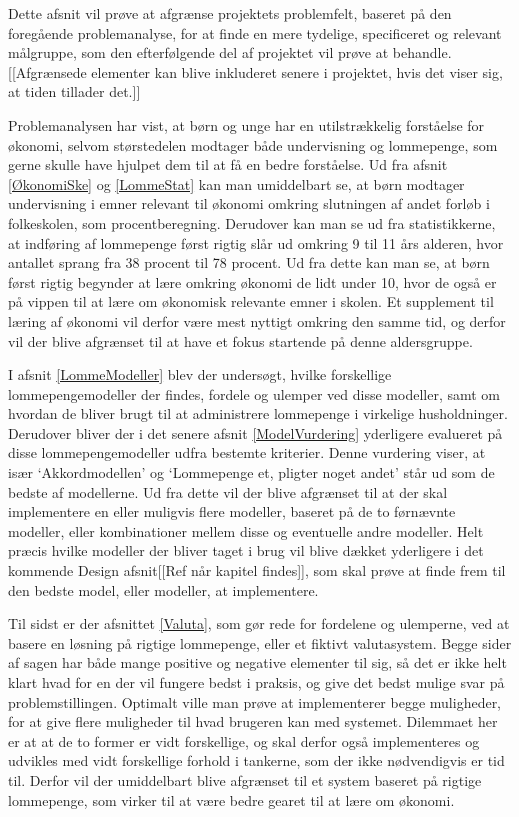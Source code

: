 Dette afsnit vil prøve at afgrænse projektets problemfelt, baseret på den foregående problemanalyse, for at finde en mere tydelige, specificeret og relevant målgruppe, som den efterfølgende del af projektet vil prøve at behandle. [[Afgrænsede elementer kan blive inkluderet senere i projektet, hvis det viser sig, at tiden tillader det.]]

Problemanalysen har vist, at børn og unge har en utilstrækkelig forståelse for økonomi, selvom størstedelen modtager både undervisning og lommepenge, som gerne skulle have hjulpet dem til at få en bedre forståelse. Ud fra afsnit \ref{ØkonomiSke} og \ref{LommeStat}  kan man umiddelbart se, at børn modtager undervisning i emner relevant til økonomi omkring slutningen af andet forløb i folkeskolen, som procentberegning. Derudover kan man se ud fra statistikkerne, at indføring af lommepenge først rigtig slår ud omkring 9 til 11 års alderen, hvor antallet sprang fra 38 procent til 78 procent. Ud fra dette kan man se, at børn først rigtig begynder at lære omkring økonomi de lidt under 10, hvor de også er på vippen til at lære om økonomisk relevante emner i skolen. Et supplement til læring af økonomi vil derfor være mest nyttigt omkring den samme tid, og derfor vil der blive afgrænset til at have et fokus startende på denne aldersgruppe.

I afsnit \ref{LommeModeller} blev der undersøgt, hvilke forskellige lommepengemodeller der findes, fordele og ulemper ved disse modeller, samt om hvordan de bliver brugt til at administrere lommepenge i virkelige husholdninger. Derudover bliver der i det senere afsnit \ref{ModelVurdering} yderligere evalueret på disse lommepengemodeller udfra bestemte kriterier. Denne vurdering viser, at især ‘Akkordmodellen’ og ‘Lommepenge et, pligter noget andet’ står ud som de bedste af modellerne. Ud fra dette vil der blive afgrænset til at der skal implementere en eller muligvis flere modeller, baseret på de to førnævnte modeller, eller kombinationer mellem disse og eventuelle andre modeller. Helt præcis hvilke modeller der bliver taget i brug vil blive dækket yderligere i det kommende Design afsnit[[Ref når kapitel findes]], som skal prøve at finde frem til den bedste model, eller modeller, at implementere.

Til sidst er der afsnittet \ref{Valuta}, som gør rede for fordelene og ulemperne, ved at basere en løsning på rigtige lommepenge, eller et fiktivt valutasystem. Begge sider af sagen har både mange positive og negative elementer til sig, så det er ikke helt klart hvad for en der vil fungere bedst i praksis, og give det bedst mulige svar på problemstillingen. Optimalt ville man prøve at implementerer begge muligheder, for at give flere muligheder til hvad brugeren kan med systemet. Dilemmaet her er at at de to former er vidt forskellige, og skal derfor også implementeres og udvikles med vidt forskellige forhold i tankerne, som der ikke nødvendigvis er tid til. Derfor vil der umiddelbart blive afgrænset til et system baseret på rigtige lommepenge, som virker til at være bedre gearet til at lære om økonomi.
